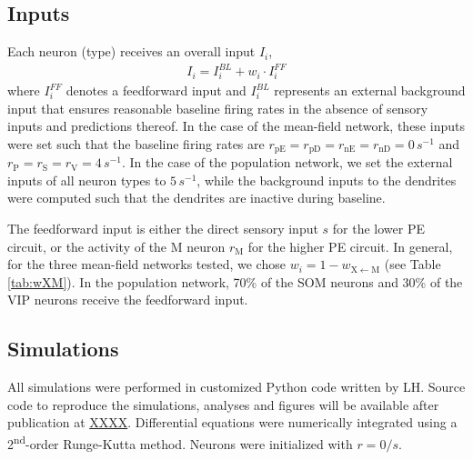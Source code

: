 \documentclass[10pt,a4paper,draft]{article}
\begin{document}
\subsection{Inputs}
%
Each neuron (type) receives an overall input $I_i$,
%
\begin{align*}
I_i = I_i^{BL} + w_i \cdot I_{i}^{FF}
\end{align*}
%
where $I_{i}^{FF}$ denotes a feedforward input and $I_i^{BL}$ represents an external background input that ensures reasonable baseline firing rates in the absence of sensory inputs and predictions thereof. In the case of the mean-field network, these inputs were set such that the baseline firing rates are $r_\mathrm{pE}=r_\mathrm{pD}=r_\mathrm{nE}=r_\mathrm{nD}=0\, s^{-1}$ and $r_\mathrm{P} = r_\mathrm{S}=r_\mathrm{V}=4\, s^{-1}$. In the case of the population network, we set the external inputs of all neuron types to $5\, s^{-1}$, while the background inputs to the dendrites were computed such that the dendrites are inactive during baseline.

The feedforward input is either the direct sensory input $s$ for the lower PE circuit, or the activity of the M neuron $r_\mathrm{M}$ for the higher PE circuit. In general, for the three mean-field networks tested, we chose $w_i = 1 - w_\mathrm{X\leftarrow M}$  (see Table \ref{tab:wXM}). In the population network, 70\% of the SOM neurons and 30\% of the VIP neurons receive the feedforward input.


\subsection{Simulations}
%
All simulations were performed in customized Python code written by LH. Source code to reproduce the simulations, analyses and figures will be available after publication at \url{XXXX}. Differential equations were numerically integrated using a 2\textsuperscript{nd}-order Runge-Kutta method. Neurons were initialized with $r=0/s$.
\end{document}
